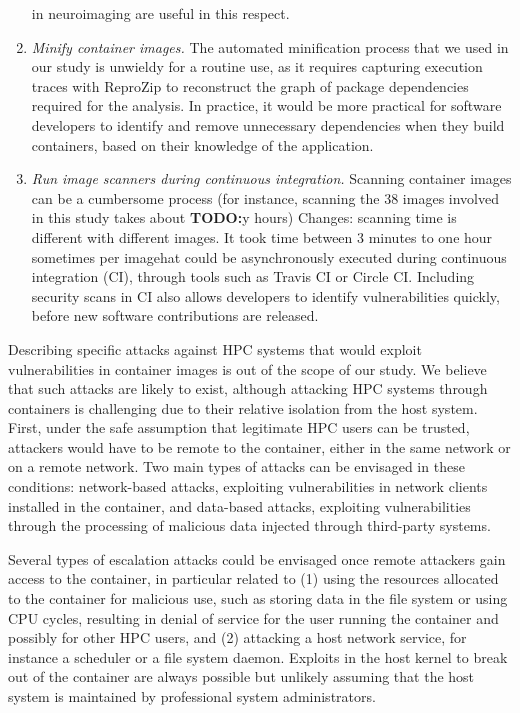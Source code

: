 \documentclass[a4paper,num-refs]{oup-contemporary}
\newcommand{\todo}[1]{\color{red}\textbf{TODO:}#1\color{black}}
\newcommand{\change}[2]{\color{cyan}Changes: #1\color{black}}
\begin{document}
\begin{enumerate}[leftmargin=0pt,itemindent=*]
in neuroimaging are useful in this respect.
\item \emph{Minify container images.} The automated minification
process that we used in our study is unwieldy for a routine use, as it
requires capturing execution traces with ReproZip to reconstruct the graph
of package dependencies required for the analysis. In practice, it would be
more practical for software developers to identify and remove unnecessary
dependencies when they build containers, based on their knowledge of the
application.
\item \emph{Run image scanners during continuous integration.} Scanning
container images can be a cumbersome process (for instance, scanning the
		38 images involved in this study takes about \todo{y} hours) \change{scanning time
		is different with different images. It took time between 3 minutes to one hour sometimes
		per image} that
could be asynchronously executed during continuous integration (CI),
through tools such as Travis CI or Circle CI. Including security scans in
CI also allows developers to identify vulnerabilities quickly,
before new software contributions are released.
\end{enumerate}

Describing specific attacks against HPC systems that would exploit
vulnerabilities in container images is out of the scope of our study. We
believe that such attacks are likely to exist, although attacking HPC
systems through containers is challenging due to their relative isolation
from the host system. First, under the safe assumption that legitimate HPC
users can be trusted, attackers would have to be remote to the container,
either in the same network or on a remote network. Two main types of
attacks can be envisaged in these conditions: network-based attacks,
exploiting vulnerabilities in network clients installed in the container,
and data-based attacks, exploiting vulnerabilities through the processing
of malicious data injected through third-party systems.

Several types of escalation attacks could be envisaged once remote
attackers gain access to the container, in particular related to (1) using
the resources allocated to the container for malicious use, such as storing
data in the file system or using CPU cycles, resulting in denial of service
for the user running the container and possibly for other HPC users, and
(2) attacking a host network service, for instance a scheduler or a file
system daemon. Exploits in the host kernel to break out of the container
are always possible but unlikely assuming that the host system is
maintained by professional system administrators.
\end{document}
